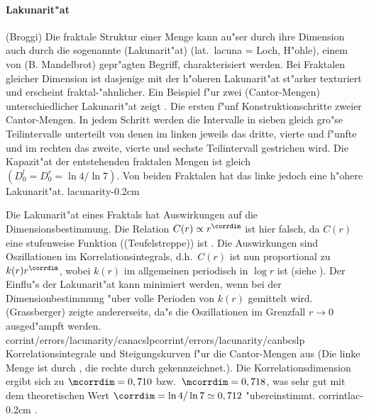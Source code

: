 \paragraph{Lakunarit"at}
\korrektur(Broggi)
Die fraktale Struktur einer Menge kann au"ser durch ihre Dimension auch durch die
sogenannte \begriff(Lakunarit"at) (lat.\  lacuna = Loch, H"ohle), einem von
\autor(B. Mandelbrot) \cite{Mandelbrot82} gepr"agten Begriff, charakterisiert werden. 
Bei Fraktalen gleicher Dimension ist dasjenige mit der h"oheren Lakunarit"at st"arker
texturiert und erscheint fraktal-"ahnlicher. Ein Beispiel f"ur zwei \begriff(Cantor-Mengen)
unterschiedlicher Lakunarit"at zeigt .
%
{Die ersten f"unf Konstruktionschritte zweier Cantor-Mengen. In jedem Schritt werden die
Intervalle in sieben gleich gro"se Teilintervalle unterteilt von denen im linken jeweils
das dritte, vierte und f"unfte und im rechten das zweite, vierte und sechste Teilintervall
gestrichen wird. Die Kapazit"at der entstehenden fraktalen Mengen ist 
gleich $(D^l_0=D^r_0=\ln4/\ln 7)$. Von beiden Fraktalen hat das linke jedoch eine h"ohere Lakunarit"at.
}{lacunarity}{-0.2cm}

Die Lakunarit"at eines Fraktals hat Auswirkungen auf die Dimensionsbestimmung. Die
Relation $C(r)\propto r^\corrdim$ ist hier falsch, da $C(r)$ eine stufenweise Funktion
(\begriff(Teufelstreppe)) ist \cite{Broggi88}. 
Die Auswirkungen sind Oszillationen im Korrelationsintegrals, d.h.\  $C(r)$ ist nun proportional zu
$k(r)r^\corrdim$, wobei $k(r)$ im allgemeinen periodisch in $\log r$ ist
(siehe ). Der Einflu"s der  Lakunarit"at kann minimiert werden, wenn bei
der Dimensionbestimmung "uber volle Perioden von $k(r)$ gemittelt wird.
\autor(Grassberger) zeigte andererseits, da"s die Oszillationen im Grenzfall $r\to 0$
ausged"ampft werden\cite{Grassberger88}.
%
{corrint/errors/lacunarity/canacslp}{corrint/errors/lacunarity/canbcslp}
{Korrelationsintegrale und Steigungskurven f"ur die Cantor-Mengen aus 
(Die linke Menge ist durch \gpmarkb, die rechte durch \gpmarkd{} gekennzeichnet.). Die
Korrelationsdimension ergibt sich zu $\mcorrdim=0,710$ bzw.\  $\mcorrdim=0,718$, was sehr gut mit dem
theoretischen Wert $\corrdim=\ln 4 /\ln 7\simeq 0,712$ "ubereinstimmt\footnotemark.
}{corrintlac}{-0.2cm}
.



